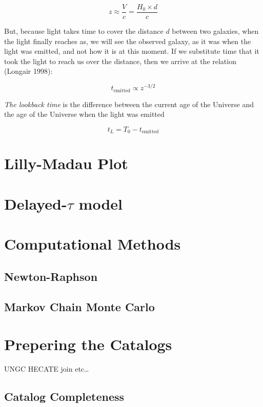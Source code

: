 \documentclass[
]{article}
\begin{document}
\[
z \approx \frac{V}{c} = \frac{H_0\times d}{c}
\]

But, because light takes time to cover the distance \(d\) between two
galaxies, when the light finally reaches as, we will see the observed
galaxy, as it was when the light was emitted, and not how it is at this
moment. If we substitute time that it took the light to reach us over
the distance, then we arrive at the relation (Longair 1998):

\[
t_\text{emitted} \propto z^{-3/2}
\]

\emph{The lookback time} is the difference between the current age of
the Universe and the age of the Universe when the light was emitted

\[
t_L = T_0-t_\text{emitted}
\]

\section{Lilly-Madau Plot}\label{lilly-madau-plot-1}

\section{\texorpdfstring{Delayed-\(\tau\)
model}{Delayed-\textbackslash tau model}}\label{delayed-tau-model}

\section{Computational Methods}\label{computational-methods}

\subsection{Newton-Raphson}\label{newton-raphson}

\subsection{Markov Chain Monte Carlo}\label{markov-chain-monte-carlo}

\section{Prepering the Catalogs}\label{prepering-the-catalogs}

UNGC HECATE join etc\ldots{}

\subsection{Catalog Completeness}\label{catalog-completeness}
\end{document}
